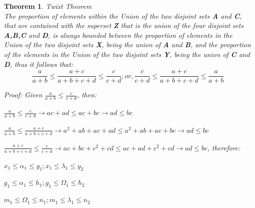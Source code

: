 \documentclass[preprint,13pt]{elsarticle}
\newtheorem{theorem}{Theorem}[section]
\begin{document}
\newpage
\begin{theorem}{Twixt Theorem}\\
The proportion of elements within the Union of the two disjoint sets \textbf{A} and \textbf{C}, that are contained with the superset \textbf{Z} that is the union of the four disjoint sets \textbf{A,B,C} and \textbf{D}, is always bounded between the proportion of elements in the Union of the two disjoint sets \textbf{X}, being the union of  \textbf{A} and \textbf{B}, and the proportion of the elements in the Union of the two disjoint sets \textbf{Y}, being the union of  \textbf{C} and \textbf{D}, thus it follows that:
$$\frac{a}{a+b}\le\frac{a+c}{a+b+c+d}\le\frac{c}{c+d}; or, \frac{c}{c+d}\le\frac{a+c}{a+b+c+d}\le\frac{a}{a+b}$$

Proof:
Given $\frac{a}{a+b}\le\frac{c}{c+d}$, then:

$\frac{a}{a+b}\le\frac{c}{c+d} \rightarrow ac+ad\le ac+bc \rightarrow ad\le bc$

$\frac{a}{a+b}\le\frac{a+c}{a+b+c+d} \rightarrow a^2+ab+ac+ad\le a^2+ab+ac+bc \rightarrow ad\le bc$

$\frac{a+c}{a+b+c+d}\le\frac{c}{c+d} \rightarrow ac+bc+c^2+cd\le ac+ad+c^2+cd \rightarrow ad\le bc$, therefore:

$x_{1} \le \alpha_{1} \le y_{1}; x_{1} \le \lambda_{1} \le y_{2}$

$g_{1} \le \alpha_{1} \le h_{1}; g_{1} \le \Omega_{1} \le h_{2}$

$m_{1} \le \Omega_{1} \le n_{1}; m_{1} \le \lambda_{1} \le n_{2}$
\end{theorem}
\end{document}
